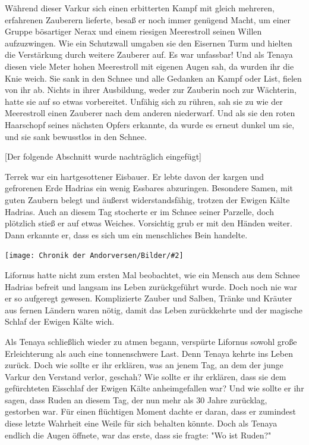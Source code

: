 \documentclass[10pt, a4paper, oneside]{book}
\newcommand{\bildmitts}[2][height=0.32\textwidth,width=0.48\textwidth,keepaspectratio]{%
    \begin{center}
        \texttt{[image: Chronik der Andorversen/Bilder/\#2]}
    \end{center}
}
\begin{document}
\begin{multicols}{2}
Während dieser Varkur sich einen erbitterten Kampf mit gleich mehreren, erfahrenen Zauberern lieferte, besaß er noch immer genügend Macht, um einer Gruppe bösartiger Nerax und einem riesigen Meerestroll seinen Willen aufzuzwingen. Wie ein Schutzwall umgaben sie den Eisernen Turm und hielten die Verstärkung durch weitere Zauberer auf. Es war unfassbar!
Und als Tenaya diesen viele Meter hohen Meerestroll mit eigenen Augen sah, da wurden ihr die Knie weich. Sie sank in den Schnee und alle Gedanken an Kampf oder List, fielen von ihr ab. Nichts in ihrer Ausbildung, weder zur Zauberin noch zur Wächterin, hatte sie auf so etwas vorbereitet. Unfähig sich zu rühren, sah sie zu wie der Meerestroll einen Zauberer nach dem anderen niederwarf. Und als sie den roten Haarschopf seines nächsten Opfers erkannte, da wurde es erneut dunkel um sie, und sie sank bewusstlos in den Schnee.

[Der folgende Abschnitt wurde nachträglich eingefügt]

Terrek war ein hartgesottener Eisbauer. Er lebte davon der kargen und gefrorenen Erde Hadrias ein wenig Essbares abzuringen. Besondere Samen, mit guten Zaubern belegt und äußerst widerstandsfähig, trotzen der Ewigen Kälte Hadrias.
Auch an diesem Tag stocherte er im Schnee seiner Parzelle, doch plötzlich stieß er auf etwas Weiches. Vorsichtig grub er mit den Händen weiter. Dann erkannte er, dass es sich um ein menschliches Bein handelte.

\bildmitts{Tenaya die Wächterin des Feuers Bild 3.jpg}

Lifornus hatte nicht zum ersten Mal beobachtet, wie ein Mensch aus dem Schnee Hadrias befreit und langsam ins Leben zurückgeführt wurde. Doch noch nie war er so aufgeregt gewesen. Komplizierte Zauber und Salben, Tränke und Kräuter aus fernen Ländern waren nötig, damit das Leben zurückkehrte und der magische Schlaf der Ewigen Kälte wich.

Als Tenaya schließlich wieder zu atmen begann, verspürte Lifornus sowohl große Erleichterung als auch eine tonnenschwere Last. Denn Tenaya kehrte ins Leben zurück. Doch wie sollte er ihr erklären, was an jenem Tag, an dem der junge Varkur den Verstand verlor, geschah? Wie sollte er ihr erklären, dass sie dem gefürchteten Eisschlaf der Ewigen Kälte anheimgefallen war? Und wie sollte er ihr sagen, dass Ruden an diesem Tag, der nun mehr als 30 Jahre zurücklag, gestorben war. Für einen flüchtigen Moment dachte er daran, dass er zumindest diese letzte Wahrheit eine Weile für sich behalten könnte. Doch als Tenaya endlich die Augen öffnete, war das erste, dass sie fragte: "Wo ist Ruden?"


\end{multicols}
\end{document}
